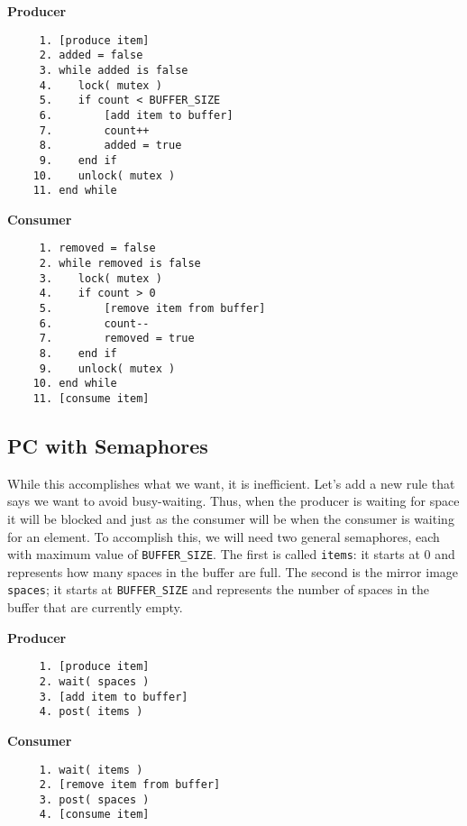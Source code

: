 \begin{multicols}{2}
	\textbf{Producer}\vspace{-2em}
	\begin{verbatim}
	 1. [produce item]
	 2. added = false
	 3. while added is false
	 4.    lock( mutex )
	 5.    if count < BUFFER_SIZE
	 6.        [add item to buffer]
	 7.        count++
	 8.        added = true
	 9.    end if
	10.    unlock( mutex )
	11. end while
  \end{verbatim}
	\columnbreak
	\textbf{Consumer}\vspace{-2em}
	\begin{verbatim}
	 1. removed = false
	 2. while removed is false
	 3.    lock( mutex )
	 4.    if count > 0
	 5.        [remove item from buffer]
	 6.        count--
	 7.        removed = true
	 8.    end if
	 9.    unlock( mutex )
	10. end while
	11. [consume item]
  \end{verbatim}
\end{multicols}
\vspace{-2em}


\subsection*{PC with Semaphores}

While this accomplishes what we want, it is inefficient. Let's add a new rule that says we want to avoid busy-waiting. Thus, when the producer is waiting for space it will be blocked and just as the consumer will be when the consumer is waiting for an element. To accomplish this, we will need two general semaphores, each with maximum value of \texttt{BUFFER\_SIZE}. The first is called \texttt{items}: it starts at 0 and represents how many spaces in the buffer are full. The second is the mirror image \texttt{spaces}; it starts at \texttt{BUFFER\_SIZE} and represents the number of spaces in the buffer that are currently empty.

\begin{multicols}{2}
	\textbf{Producer}\vspace{-2em}
	\begin{verbatim}
	 1. [produce item]
	 2. wait( spaces )
	 3. [add item to buffer]
	 4. post( items )
  \end{verbatim}
	\columnbreak
	\textbf{Consumer}\vspace{-2em}
	\begin{verbatim}
	 1. wait( items )
	 2. [remove item from buffer]
	 3. post( spaces )
	 4. [consume item]
  \end{verbatim}
\end{multicols}
\vspace{-2em}

